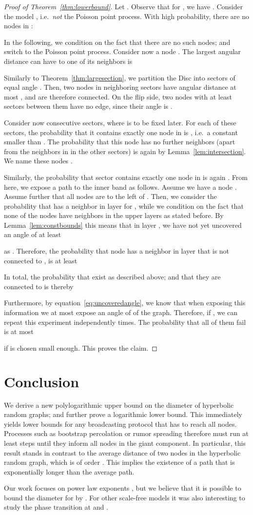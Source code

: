 \documentclass{llncs}
\newcommand{\thmref}[1]{Theorem~\ref{thm:#1}}
\newcommand{\lemref}[1]{Lemma~\ref{lem:#1}}
\newcommand{\eq}[1]{equation~\eqref{eq:#1}}
\begin{document}
\begin{proof}[Proof of \thmref{lowerbound}]
Let . Observe that for , we have . Consider the model , i.e.\ {\em not} the Poisson point process. With high probability, there are no nodes in :

In the following, we condition on the fact that there are no such nodes; and switch to the Poisson point process. Consider now a node . The largest angular distance  can have to one of its neighbors is


Similarly to \thmref{largesection}, we partition the Disc  into  sectors of equal angle . Then, two nodes  in neighboring sectors have angular distance at most  , and are therefore connected. On the flip side, two nodes with at least  sectors between them have no edge, since their angle is .

Consider now  consecutive sectors, where  is to be fixed later. For each of these  sectors, the probability that it contains exactly one node in  is 
, i.e.\ a constant smaller than . The probability that this node has no further neighbors (apart from the neighbors in  in the other sectors) is again  by \lemref{intersection}. We name these nodes .

Similarly, the probability that sector  contains exactly one node  in  is again . From here, we expose a path to the inner band  as follows. Assume we have a node . Assume further that all nodes  are to the left of . Then, we consider the probability that  has a neighbor in layer  for , while we condition on the fact that none of the nodes  have neighbors in the upper layers as stated before. By \lemref{constbounds} this means that in layer , we have not yet uncovered an angle of at least 

as . Therefore, the probability that node  has a neighbor in layer  that is not connected to , is at least

In total, the probability that  exist as described above; and that they are connected to  is thereby


Furthermore, by \eq{uncoveredangle}, we know that when exposing this information we at most expose an angle of  of the graph. 
Therefore, if , we can repeat this experiment independently  times. The probability that all of them fail is at most
  
if  is chosen small enough. This proves the claim.
\end{proof}


\section{Conclusion}
We derive a new polylogarithmic upper bound on the diameter of hyperbolic random graphs; and further prove a logarithmic lower bound. This  immediately yields lower bounds for any broadcasting protocol that has to reach all nodes. Processes such as bootstrap percolation or rumor spreading therefore must run at least  steps until they inform all nodes in the giant component. In particular, this result stands in contrast to the average distance of two nodes in the hyperbolic random graph, which is of order  \cite{bringmann2015geometric,abdullah2015typical}. This implies the existence of a path that is exponentially longer than the average path.

Our work focuses on power law exponents , but we believe that it is possible to bound the diameter for  by . For other scale-free models it was also interesting to study the phase transition at  and .



\end{document}
